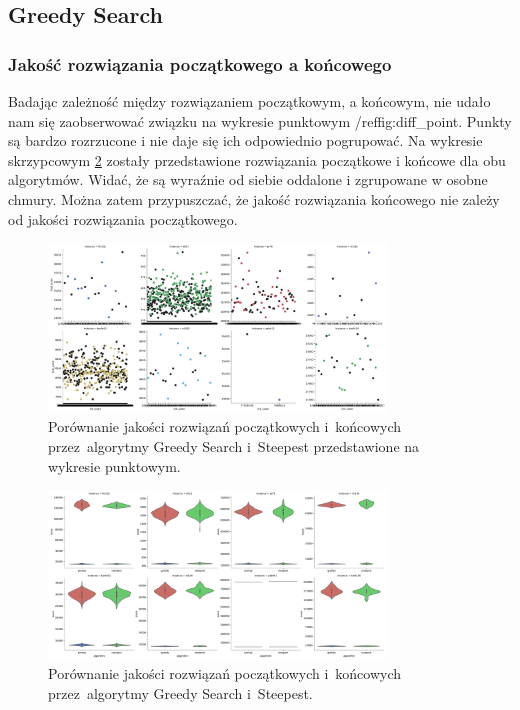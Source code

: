 \subsection{Greedy Search}

\subsubsection{Jakość rozwiązania początkowego a końcowego}

Badając zależność między rozwiązaniem początkowym, a końcowym, nie udało nam się zaobserwować związku na wykresie punktowym /ref{fig:diff_point}. Punkty są bardzo rozrzucone i nie daje się ich odpowiednio pogrupować. Na wykresie skrzypcowym \ref{fig:diff} zostały przedstawione rozwiązania początkowe i końcowe dla obu algorytmów. Widać, że są wyraźnie od siebie oddalone i zgrupowane w osobne chmury. Można zatem przypuszczać, że jakość rozwiązania końcowego nie zależy od jakości rozwiązania początkowego.

\begin{figure}
\begin{center}
\includegraphics[width=0.8\textwidth]{graphs/init_vs_final_score_point.pdf}
\end{center}
\caption{Porównanie jakości rozwiązań początkowych i~końcowych przez~algorytmy Greedy Search i~Steepest przedstawione na wykresie punktowym.}
\label{fig:diff_point}
\end{figure}

\begin{figure}
\begin{center}
\includegraphics[width=0.8\textwidth]{graphs/init_vs_final_score_violin.pdf}
\end{center}
\caption{Porównanie jakości rozwiązań początkowych i~końcowych przez~algorytmy Greedy Search i~Steepest.}
\label{fig:diff}
\end{figure}

